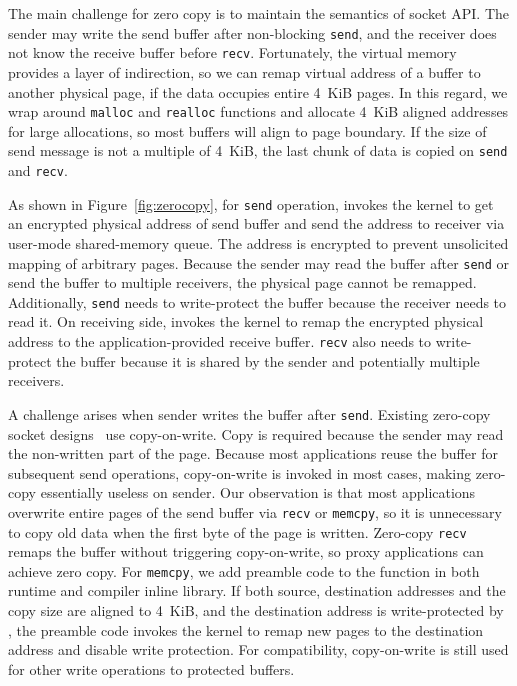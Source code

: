 The main challenge for zero copy is to maintain the semantics of socket API. The sender may write the send buffer after non-blocking \texttt{send}, and the receiver does not know the receive buffer before \texttt{recv}.
Fortunately, the virtual memory provides a layer of indirection, so we can remap virtual address of a buffer to another physical page, if the data occupies entire 4~KiB pages.
In this regard, we wrap around \texttt{malloc} and \texttt{realloc} functions and allocate 4~KiB aligned addresses for large allocations, so most buffers will align to page boundary.
If the size of send message is not a multiple of 4~KiB, the last chunk of data is copied on \texttt{send} and \texttt{recv}.

As shown in Figure~\ref{fig:zerocopy}, for \texttt{send} operation, \libipc{} invokes the kernel to get an encrypted physical address of send buffer and send the address to receiver via user-mode shared-memory queue.
The address is encrypted to prevent unsolicited mapping of arbitrary pages.
Because the sender may read the buffer after \texttt{send} or send the buffer to multiple receivers, the physical page cannot be remapped.
Additionally, \texttt{send} needs to write-protect the buffer because the receiver needs to read it.
On receiving side, \libipc{} invokes the kernel to remap the encrypted physical address to the application-provided receive buffer.
\texttt{recv} also needs to write-protect the buffer because it is shared by the sender and potentially multiple receivers.

A challenge arises when sender writes the buffer after \texttt{send}.
Existing zero-copy socket designs~\cite{thadani1995efficient,chu1996zero} use copy-on-write. Copy is required because the sender may read the non-written part of the page.
Because most applications reuse the buffer for subsequent send operations, copy-on-write is invoked in most cases, making zero-copy essentially useless on sender.
Our observation is that most applications overwrite entire pages of the send buffer via \texttt{recv} or \texttt{memcpy}, so it is unnecessary to copy old data when the first byte of the page is written.
Zero-copy \texttt{recv} remaps the buffer without triggering copy-on-write, so proxy applications can achieve zero copy.
For \texttt{memcpy}, we add preamble code to the function in both \libipc{} runtime and compiler inline library. If both source, destination addresses and the copy size are aligned to 4~KiB, and the destination address is write-protected by \libipc{}, the preamble code invokes the kernel to remap new pages to the destination address and disable write protection.
For compatibility, copy-on-write is still used for other write operations to protected buffers.

